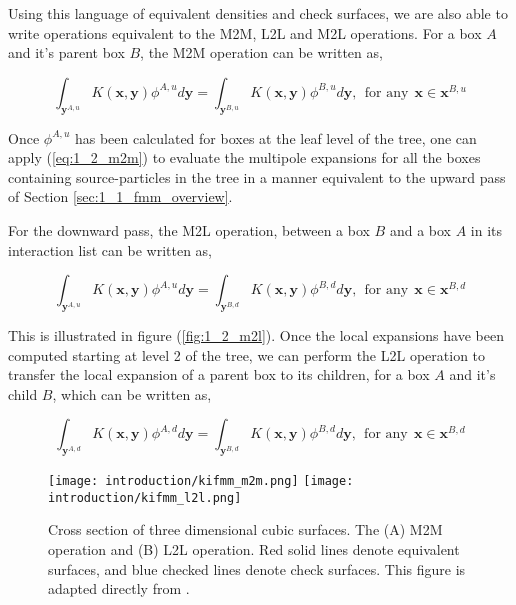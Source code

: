 Using this language of equivalent densities and check surfaces, we are also able to
write operations equivalent to the M2M, L2L and M2L operations. For a box $A$
and it's parent box $B$, the M2M operation can be written as,

\begin{equation}
    \int_{\mathbf{y}^{A,u}} K(\mathbf{x}, \mathbf{y})\phi^{A, u} d\mathbf{y} =   \int_{\mathbf{y}^{B,u}} K(\mathbf{x}, \mathbf{y})\phi^{B, u} d\mathbf{y}, \> \> \text{for any} \> \> \mathbf{x} \in \mathbf{x}^{B, u}
    \label{eq:1_2_m2m}
\end{equation}

Once $\phi^{A, u}$ has been calculated for boxes at the leaf level of the tree,
one can apply (\ref{eq:1_2_m2m}) to evaluate the multipole expansions for all
the boxes containing \gls{source-particles} in the tree in a manner equivalent
to the upward pass of Section \ref{sec:1_1_fmm_overview}.

For the downward pass, the M2L operation, between a box $B$ and a box $A$ in its
interaction list can be written as,

\begin{equation}
    \int_{\mathbf{y}^{A,u}} K(\mathbf{x}, \mathbf{y})\phi^{A, u} d\mathbf{y} =   \int_{\mathbf{y}^{B,d}} K(\mathbf{x}, \mathbf{y})\phi^{B, d} d\mathbf{y}, \> \> \text{for any} \> \> \mathbf{x} \in \mathbf{x}^{B, d}
\label{eq:1_2_m2l}
\end{equation}

This is illustrated in figure (\ref{fig:1_2_m2l}). Once the local expansions
have  been computed starting at level 2 of the tree, we can perform the L2L
operation to transfer the local expansion of a parent box to its children,
for a box $A$ and it's child $B$, which can be written as,

\begin{equation}
    \int_{\mathbf{y}^{A,d}} K(\mathbf{x}, \mathbf{y})\phi^{A, d} d\mathbf{y} =   \int_{\mathbf{y}^{B,d}} K(\mathbf{x}, \mathbf{y})\phi^{B, d} d\mathbf{y}, \> \> \text{for any} \> \> \mathbf{x} \in \mathbf{x}^{B, d}
    \label{eq:1_2_l2l}
\end{equation}

\begin{figure}[!h]
    \centering
    {\texttt{[image: introduction/kifmm\_m2m.png]}}
    \hfill
  {\texttt{[image: introduction/kifmm\_l2l.png]}}
  \vspace{0pt}
  \caption{Cross section of three dimensional cubic surfaces. The (A) M2M operation and (B) L2L operation. Red solid lines
  denote equivalent surfaces, and blue checked lines denote check surfaces. This
  figure is adapted directly from \cite{Ying:2004:JCP}.}
  \label{fig:1_2_m2m_l2l}
\end{figure}

